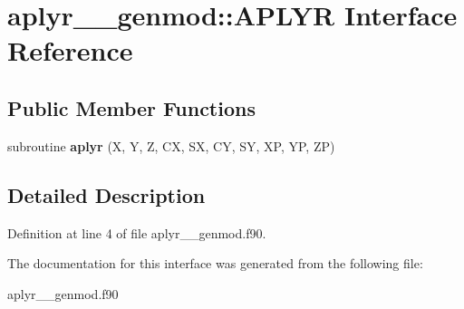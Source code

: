\hypertarget{interfaceaplyr____genmod_1_1_a_p_l_y_r}{\section{aplyr\+\_\+\+\_\+genmod\+:\+:A\+P\+L\+Y\+R Interface Reference}
\label{interfaceaplyr____genmod_1_1_a_p_l_y_r}
}
\subsection*{Public Member Functions}
\begin{DoxyCompactItemize}
\item 
\hypertarget{interfaceaplyr____genmod_1_1_a_p_l_y_r_a0a948246c19373e683aa3e84d0cd031d}{subroutine {\bfseries aplyr} (X, Y, Z, C\+X, S\+X, C\+Y, S\+Y, X\+P, Y\+P, Z\+P)}\label{interfaceaplyr____genmod_1_1_a_p_l_y_r_a0a948246c19373e683aa3e84d0cd031d}

\end{DoxyCompactItemize}


\subsection{Detailed Description}


Definition at line 4 of file aplyr\+\_\+\+\_\+genmod.\+f90.



The documentation for this interface was generated from the following file\+:\begin{DoxyCompactItemize}
\item 
aplyr\+\_\+\+\_\+genmod.\+f90\end{DoxyCompactItemize}
